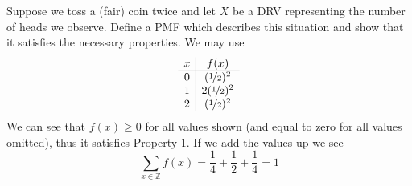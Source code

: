 \documentclass{report}
\begin{document}
\begin{example}
    Suppose we toss a (fair) coin twice and let $X$ be a DRV representing the number of heads we observe. Define a PMF which describes this situation and show that it satisfies the necessary properties.
    \solution
    We may use
        \[
            \begin{array}{c|c}
                x & f(x) \\
                \hline
                0 & (\nicefrac 12)^2 \\
                1 & 2(\nicefrac 12)^2 \\
                2 & (\nicefrac 12)^2 
            \end{array}
        \]
    We can see that $f(x)\ge 0$ for all values shown (and equal to zero for all values omitted), thus it satisfies Property 1. If we add the values up we see
    \[
        \sum_{x\in\mathbb Z}f(x)=\frac 14 + \frac 12 + \frac 14 = 1
    \]
\end{example}
\end{document}
